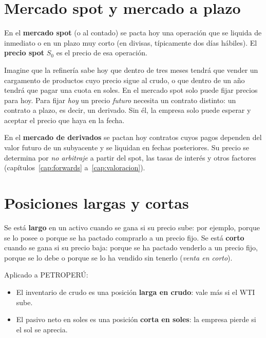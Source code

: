 \section{Mercado spot y mercado a plazo}

\begin{definicion}
En el \textbf{mercado spot} (o al contado) se pacta hoy una operación que se liquida de inmediato o en un plazo muy corto (en divisas, típicamente dos días hábiles). El \textbf{precio spot} $S_0$ es el precio de esa operación.
\end{definicion}

Imagine que la refinería sabe hoy que dentro de tres meses tendrá que vender un cargamento de productos cuyo precio sigue al crudo, o que dentro de un año tendrá que pagar una cuota en soles. En el mercado spot solo puede fijar precios para hoy. Para fijar \emph{hoy} un precio \emph{futuro} necesita un contrato distinto: un contrato a plazo, es decir, un derivado. Sin él, la empresa solo puede esperar y aceptar el precio que haya en la fecha.

\begin{definicion}
En el \textbf{mercado de derivados} se pactan hoy contratos cuyos pagos dependen del valor futuro de un subyacente y se liquidan en fechas posteriores. Su precio se determina por \emph{no arbitraje} a partir del spot, las tasas de interés y otros factores (capítulos~\ref{cap:forwards} a~\ref{cap:valoracion}).
\end{definicion}

\section{Posiciones largas y cortas}

\begin{definicion}
Se está \textbf{largo} en un activo cuando se gana si su precio sube: por ejemplo, porque se lo posee o porque se ha pactado comprarlo a un precio fijo. Se está \textbf{corto} cuando se gana si su precio baja: porque se ha pactado venderlo a un precio fijo, porque se lo debe o porque se lo ha vendido sin tenerlo (\emph{venta en corto}).
\end{definicion}


Aplicado a PETROPERÚ:
\begin{itemize}
\item El inventario de crudo es una posición \textbf{larga en crudo}: vale más si el WTI sube.
\item El pasivo neto en soles es una posición \textbf{corta en soles}: la empresa pierde si el sol se aprecia.
\end{itemize}

